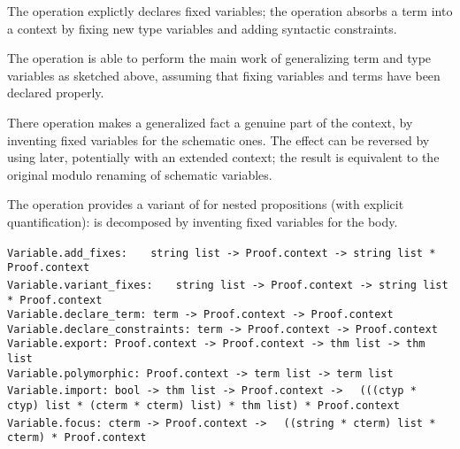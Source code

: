 \begin{isabellebody}
\begin{isamarkuptext}
  The  operation explictly declares fixed
  variables; the  operation absorbs a term into
  a context by fixing new type variables and adding syntactic
  constraints.

  The  operation is able to perform the main work of
  generalizing term and type variables as sketched above, assuming
  that fixing variables and terms have been declared properly.

  There  operation makes a generalized fact a genuine
  part of the context, by inventing fixed variables for the schematic
  ones.  The effect can be reversed by using  later,
  potentially with an extended context; the result is equivalent to
  the original modulo renaming of schematic variables.

  The  operation provides a variant of 
  for nested propositions (with explicit quantification):  is
  decomposed by inventing fixed variables  for the body.%
\end{isamarkuptext}%
\isamarkuptrue%
%
\isadelimmlref
%
\endisadelimmlref
%
\isatagmlref
%
\begin{isamarkuptext}%
\begin{mldecls}
  \verb|Variable.add_fixes: |\isasep\isanewline%
\verb|  string list -> Proof.context -> string list * Proof.context| \\
  \verb|Variable.variant_fixes: |\isasep\isanewline%
\verb|  string list -> Proof.context -> string list * Proof.context| \\
  \verb|Variable.declare_term: term -> Proof.context -> Proof.context| \\
  \verb|Variable.declare_constraints: term -> Proof.context -> Proof.context| \\
  \verb|Variable.export: Proof.context -> Proof.context -> thm list -> thm list| \\
  \verb|Variable.polymorphic: Proof.context -> term list -> term list| \\
  \verb|Variable.import: bool -> thm list -> Proof.context ->|\isasep\isanewline%
\verb|  (((ctyp * ctyp) list * (cterm * cterm) list) * thm list) * Proof.context| \\
  \verb|Variable.focus: cterm -> Proof.context ->|\isasep\isanewline%
\verb|  ((string * cterm) list * cterm) * Proof.context| \\
  \end{mldecls}


\end{isamarkuptext}
\end{isabellebody}
